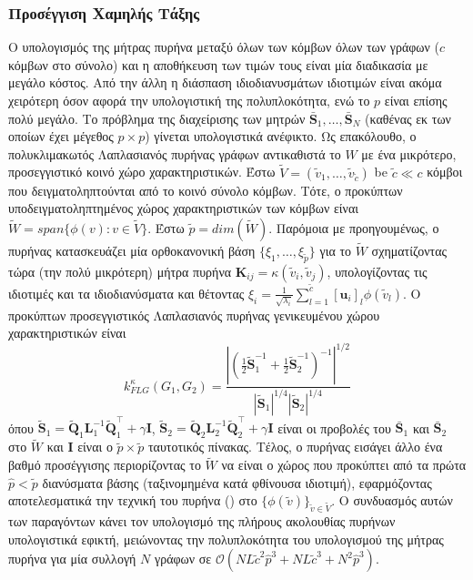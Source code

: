 \subsubsection{Προσέγγιση Χαμηλής Τάξης}
Ο υπολογισμός της μήτρας πυρήνα μεταξύ όλων των κόμβων όλων των γράφων ($c$ κόμβων στο σύνολο) και η αποθήκευση των τιμών τους είναι μία διαδικασία με μεγάλο κόστος.
Από την άλλη η διάσπαση ιδιοδιανυσμάτων ιδιοτιμών είναι ακόμα χειρότερη όσον αφορά την υπολογιστική της πολυπλοκότητα, ενώ το $p$ είναι επίσης πολύ μεγάλο.
Το πρόβλημα της διαχείρισης των μητρών $\bar{\mathbf{S}}_1, \ldots, \bar{\mathbf{S}}_N$ (καθένας εκ των οποίων έχει μέγεθος $p \times p$) γίνεται υπολογιστικά ανέφικτο.
Ως επακόλουθο, ο πολυκλιμακωτός Λαπλασιανός πυρήνας γράφων αντικαθιστά το $W$ με ένα μικρότερο, προσεγγιστικό κοινό χώρο χαρακτηριστικών.
Έστω $\tilde{V} = (\tilde{v}_1, \ldots, \tilde{v}_{\tilde{c}})$ be $\tilde{c} \ll c$ κόμβοι που δειγματοληπτούνται από το κοινό σύνολο κόμβων.
Τότε, ο προκύπτων υποδειγματοληπτημένος χώρος χαρακτηριστικών των κόμβων είναι $\tilde{W} = span \{ \phi(v) : v \in \tilde{V} \}$.
Έστω $\tilde{p} = dim(\tilde{W})$.
Παρόμοια με προηγουμένως, ο πυρήνας κατασκευάζει μία ορθοκανονική βάση $\{ \xi_1, \ldots, \xi_{\tilde{p}} \}$ για το $\tilde{W}$ σχηματίζοντας τώρα (την πολύ μικρότερη) μήτρα πυρήνα $\mathbf{K}_{ij} = \kappa(\tilde{v}_i, \tilde{v}_j)$, υπολογίζοντας τις ιδιοτιμές και τα ιδιοδιανύσματα και θέτοντας $\xi_i = \frac{1}{\sqrt{\lambda_i}} \sum_{l=1}^{\tilde{c}} [\mathbf{u}_i]_l \phi(\tilde{v}_l)$. 
Ο προκύπτων προσεγγιστικός Λαπλασιανός πυρήνας γενικευμένου χώρου χαρακτηριστικών είναι
\begin{equation*}
    k_{FLG}^\kappa(G_1, G_2) = \frac{| (\frac{1}{2} \tilde{\mathbf{S}}_1^{-1} + \frac{1}{2} \tilde{\mathbf{S}}_2^{-1} )^{-1} |^{1/2}}{|\tilde{\mathbf{S}}_1|^{1/4} |\tilde{\mathbf{S}}_2|^{1/4}} 
\end{equation*}
όπου $\tilde{\mathbf{S}}_1 = \tilde{\mathbf{Q}}_1 \mathbf{L}_1^{-1} \tilde{\mathbf{Q}}_1^\top + \gamma \mathbf{I}$, $\tilde{\mathbf{S}}_2 = \tilde{\mathbf{Q}}_2 \mathbf{L}_2^{-1} \tilde{\mathbf{Q}}_2^\top + \gamma \mathbf{I}$ είναι οι προβολές του $\bar{\mathbf{S}}_1$ και $\bar{\mathbf{S}}_2$ στο $\tilde{W}$ και $\mathbf{I}$ είναι ο $\tilde{p} \times \tilde{p}$ ταυτοτικός πίνακας.
Τέλος, ο πυρήνας εισάγει άλλο ένα βαθμό προσέγγισης περιορίζοντας το $\tilde{W}$ να είναι ο χώρος που προκύπτει από τα πρώτα $\hat{p} < \tilde{p}$ διανύσματα βάσης (ταξινομημένα κατά φθίνουσα ιδιοτιμή), εφαρμόζοντας αποτελεσματικά την τεχνική του  πυρήνα () στο $\{ \phi(\tilde{v}) \}_{\tilde{v} \in \tilde{V}}$.
Ο συνδυασμός αυτών των παραγόντων κάνει τον υπολογισμό της πλήρους ακολουθίας πυρήνων υπολογιστικά εφικτή, μειώνοντας την πολυπλοκότητα του υπολογισμού της μήτρας πυρήνα για μία συλλογή $N$ γράφων σε $\mathcal{O}(NL \tilde{c}^2 \hat{p}^3 + NL \tilde{c}^3 + N^2 \hat{p}^3)$.


